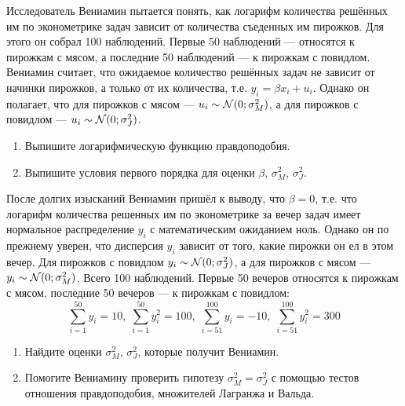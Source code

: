 \begin{problem}
Исследователь Вениамин пытается понять, как логарифм количества решённых им по эконометрике задач зависит от количества съеденных им пирожков. Для этого он собрал 100 наблюдений. Первые 50 наблюдений — относятся к пирожкам с мясом, а последние 50 наблюдений — к пирожкам с повидлом. Вениамин считает, что ожидаемое количество решённых задач не зависит от начинки пирожков, а только от их количества, т.е. $y_i = \beta x_i + u_i$. Однако он полагает, что для пирожков с мясом — $u_i\sim \mathcal{N}(0;\sigma^2_M)$, а для пирожков с повидлом — $u_i\sim \mathcal{N}(0;\sigma^2_J)$.

\begin{enumerate}
\item Выпишите логарифмическую функцию правдоподобия.
\item Выпишите условия первого порядка для оценки $\beta$, $\sigma^2_M$, $\sigma^2_J$.
\end{enumerate}
\begin{sol}
\end{sol}
\end{problem}

\begin{problem}
После долгих изысканий Вениамин пришёл к выводу, что $\beta=0$, т.е. что логарифм количества решенных им по эконометрике за вечер задач имеет нормальное распределение $y_i$ с математическим ожиданием ноль. Однако он по прежнему уверен, что дисперсия $y_i$ зависит от того, какие пирожки он ел в этом вечер. Для пирожков с повидлом $y_i \sim \mathcal{N}(0;\sigma^2_J)$, а для пирожков с мясом — $y_i\sim \mathcal{N}(0;\sigma^2_M)$. Всего 100 наблюдений. Первые 50 вечеров относятся к пирожкам с мясом, последние 50 вечеров — к пирожкам с повидлом:
\[
\sum_{i=1}^{50} y_i = 10, \; \sum_{i=1}^{50} y_i^2 = 100, \;
\sum_{i=51}^{100} y_i = -10, \; \sum_{i=51}^{100} y_i^2 = 300
\]
\begin{enumerate}
\item Найдите оценки $\sigma^2_M$, $\sigma^2_J$, которые получит Вениамин.
\item Помогите Вениамину проверить гипотезу $\sigma^2_M = \sigma^2_J$ с помощью тестов отношения правдоподобия, множителей Лагранжа и Вальда.
\end{enumerate}
\begin{sol}
\end{sol}
\end{problem}



